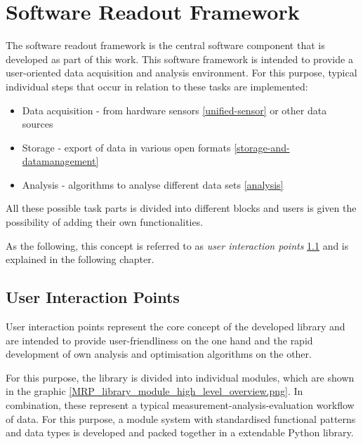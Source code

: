 \hypertarget{software-readout-framework}{%
\chapter{Software Readout Framework}\label{software-readout-framework}}

The software readout framework is the central software component that is
developed as part of this work. This software framework is intended to
provide a user-oriented data acquisition and analysis environment. For
this purpose, typical individual steps that occur in relation to these
tasks are implemented:

\begin{itemize}
\tightlist
\item
  Data acquisition - from hardware sensors \ref{unified-sensor} or other
  data sources
\item
  Storage - export of data in various open formats
  \ref{storage-and-datamanagement}
\item
  Analysis - algorithms to analyse different data sets \ref{analysis}
\end{itemize}

All these possible task parts is divided into different blocks and users
is given the possibility of adding their own functionalities.

As the following, this concept is referred to as \emph{user interaction
points} \ref{user-interaction-points} and is explained in the following
chapter.

\hypertarget{user-interaction-points}{%
\section{User Interaction Points}\label{user-interaction-points}}

User interaction points represent the core concept of the developed
library and are intended to provide user-friendliness on the one hand
and the rapid development of own analysis and optimisation algorithms on
the other.

For this purpose, the library is divided into individual modules, which
are shown in the graphic
\ref{MRP_library_module_high_level_overview.png}. In combination, these
represent a typical measurement-analysis-evaluation workflow of data.
For this purpose, a module system with standardised functional patterns
and data types is developed and packed together in a extendable Python
library.

\newpage

